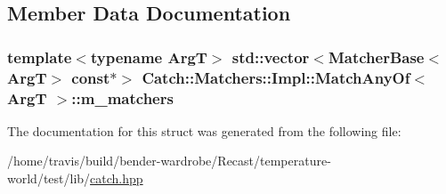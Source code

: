 \subsection{Member Data Documentation}
\hypertarget{struct_catch_1_1_matchers_1_1_impl_1_1_match_any_of_a1fb1119e6110dc15b8d5262ec0aeddd5}{
\subsubsection[{m\-\_\-matchers}]{\setlength{\rightskip}{0pt plus 5cm}template$<$typename Arg\-T$>$ std\-::vector$<${\bf Matcher\-Base}$<$Arg\-T$>$ const$\ast$$>$ {\bf Catch\-::\-Matchers\-::\-Impl\-::\-Match\-Any\-Of}$<$ Arg\-T $>$\-::m\-\_\-matchers}}\label{struct_catch_1_1_matchers_1_1_impl_1_1_match_any_of_a1fb1119e6110dc15b8d5262ec0aeddd5}


The documentation for this struct was generated from the following file\-:\begin{DoxyCompactItemize}
\item 
/home/travis/build/bender-\/wardrobe/\-Recast/temperature-\/world/test/lib/\hyperlink{catch_8hpp}{catch.\-hpp}\end{DoxyCompactItemize}

